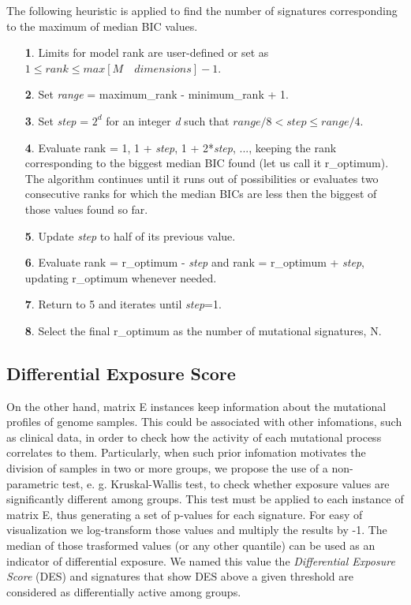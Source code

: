 \documentclass{bioinfo}
\begin{document}
The following heuristic is applied to find the number of
signatures corresponding to the maximum of median BIC values.
\begin{enumerate}
\item[\textbf{1}.] Limits for model rank are user-defined or set as 
$1\leqslant rank \leqslant max[M\quad dimensions]-1$.
\item[\textbf{2}.] Set \textit{range} = maximum\_rank - minimum\_rank + 1.
\item[\textbf{3}.] Set \textit{step} = $2^d$ for an integer \textit{d} such that 
$range/8 < step \leqslant range/4$.
\item[\textbf{4}.] Evaluate rank = 1, 1 + \textit{step}, 1 + 2*\textit{step}, ..., 
keeping the rank corresponding to the biggest median BIC found 
(let us call it r\_optimum). The algorithm continues until it runs 
out of possibilities or evaluates two consecutive ranks for which the 
median BICs are less then the biggest of those values found so far.
\item[\textbf{5}.] Update \textit{step} to half of its previous value.
\item[\textbf{6}.] Evaluate rank = r\_optimum - \textit{step} and 
rank = r\_optimum + \textit{step}, updating r\_optimum whenever needed.
\item[\textbf{7}.] Return to 5 and iterates until \textit{step}=1.
\item[\textbf{8}.] Select the final r\_optimum as the number of mutational 
signatures, N.
\end{enumerate}


\subsection{Differential Exposure Score}
On the other hand, matrix E instances keep information about the
mutational profiles of genome samples. This could be associated with
other infomations, such as clinical data, in order to check how the
activity of each mutational process correlates to them. Particularly,
when such prior infomation motivates the division of samples in two or
more groups, we propose the use of a non-parametric test,
e. g. Kruskal-Wallis test, to check whether exposure values are
significantly different among groups. This test must be applied to
each instance of matrix E, thus generating a set of p-values for each
signature.  For easy of visualization we log-transform those values
and multiply the results by -1. The median of those trasformed values
(or any other quantile) can be used as an indicator of differential
exposure. We named this value the \emph{Differential Exposure Score}
(DES) and signatures that show DES above a given threshold are
considered as differentially active among groups.
\end{document}
